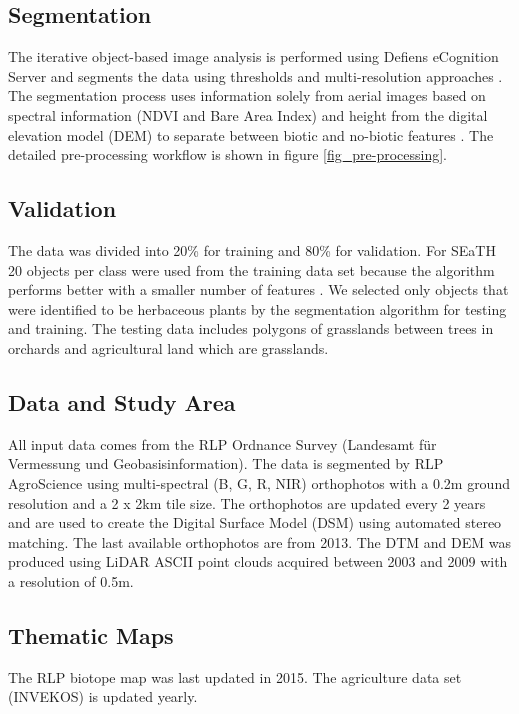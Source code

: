 \documentclass[authoryear, review,12pt,number]{elsarticle}
\begin{document}
\subsection{Segmentation} 
\label{subsec_segmentation}
The iterative object-based image analysis is performed using Defiens eCognition
Server and segments the data using thresholds and multi-resolution approaches 
\citep{baatz2001ecognition}.
The segmentation process uses information solely from
aerial images based on spectral information (NDVI and Bare Area Index) and
height from the digital elevation model (DEM) to separate between biotic and
no-biotic features \citep{Tintrup2015}. The detailed pre-processing workflow is
shown in figure \ref{fig_pre-processing}.
\subsection{Validation} 
The data was divided into 20\% for training and 80\% for validation. For SEaTH
20 objects per class were used from the training data set because the algorithm
performs better with a smaller number of features \citep{Nussbaum2006}. We 
selected only objects that were identified to be herbaceous plants by the 
segmentation algorithm for testing and training. The testing 
data includes polygons of grasslands between trees in orchards and 
agricultural land which are grasslands.

\subsection{Data and Study Area}
All input data comes from the RLP Ordnance Survey (Landesamt f\"ur Vermessung 
und Geobasisinformation). The data is segmented by RLP AgroScience using
multi-spectral (B, G, R, NIR) orthophotos with a 0.2m ground resolution and a
2 x 2km tile size. The orthophotos are updated every 2 years and are used to
create the Digital Surface Model (DSM) using automated stereo matching. The
last available orthophotos are from 2013. The DTM and
DEM was produced using LiDAR ASCII point clouds acquired between 2003 and 2009
with a resolution of 0.5m.\\
\subsection{Thematic Maps} The RLP biotope map was last updated in 2015. The
agriculture data set (INVEKOS) is updated yearly. 
\end{document}
